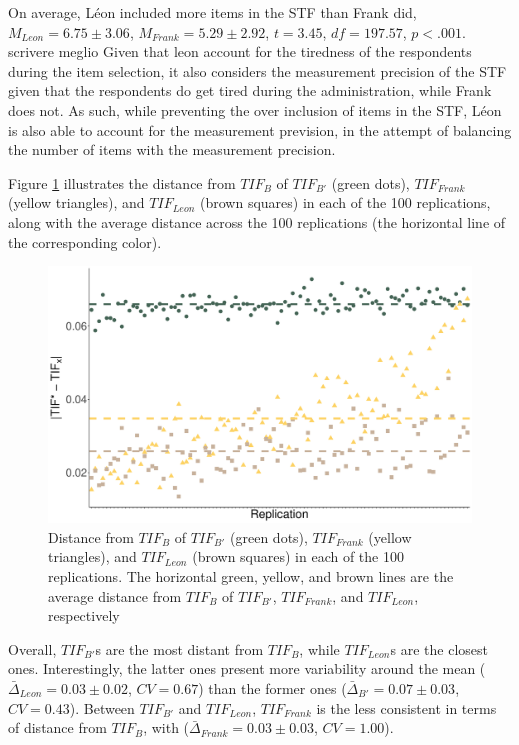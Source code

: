 \documentclass{svproc}
\begin{document}
On average, Léon included more items in the STF than Frank did, $M_{Leon} = 6.75 \pm 3.06$, $M_{Frank} = 5.29 \pm 2.92$, $t = 3.45$, $df = 197.57$, $p < .001$. 
\color{red}
scrivere meglio 
Given that leon account for the tiredness of the respondents during the item selection, it also considers the measurement precision of the STF given that the respondents do get tired during the administration, while Frank does not. As such, while preventing the over inclusion of items in the STF, Léon is also able to account for the measurement prevision, in the attempt of balancing the number of items with the measurement precision.
\normalcolor

Figure \ref{fig:points-alogirthms} illustrates the distance from $TIF_B$ of  $TIF_{B'}$ (green dots), $TIF_{Frank}$ (yellow triangles), and $TIF_{Leon}$ (brown squares) in each of the 100 replications, along with the average distance across the 100 replications (the horizontal line of the corresponding color).

\begin{figure}[!h]
	\centering
	\includegraphics[width=\linewidth]{img/points-alogirthms}
	\caption{Distance from $TIF_{B}$ of $TIF_{B'}$ (green dots), $TIF_{Frank}$ (yellow triangles), and $TIF_{Leon}$ (brown squares) in each of the 100 replications. The horizontal green, yellow, and brown lines are the average distance from $TIF_B$ of $TIF_{B'}$, $TIF_{Frank}$, and $TIF_{Leon}$, respectively}
	\label{fig:points-alogirthms}
\end{figure}

Overall, $TIF_{B'}$s are the most distant from $TIF_B$, while $TIF_{Leon}$s are the closest ones. Interestingly, the latter ones present more variability around the mean ($\bar{\Delta}_{Leon} = 0.03	\pm	0.02$, $CV =0.67$) than the former ones ($\bar{\Delta}_{B'} = 0.07	\pm	0.03$, $CV =0.43$). Between $TIF_{B'}$ and $TIF_{Leon}$, $TIF_{Frank}$ is the less consistent in terms of distance from $TIF_{B}$, with ($\bar{\Delta}_{Frank} = 0.03	\pm	0.03$, $CV = 1.00$). 
\end{document}
